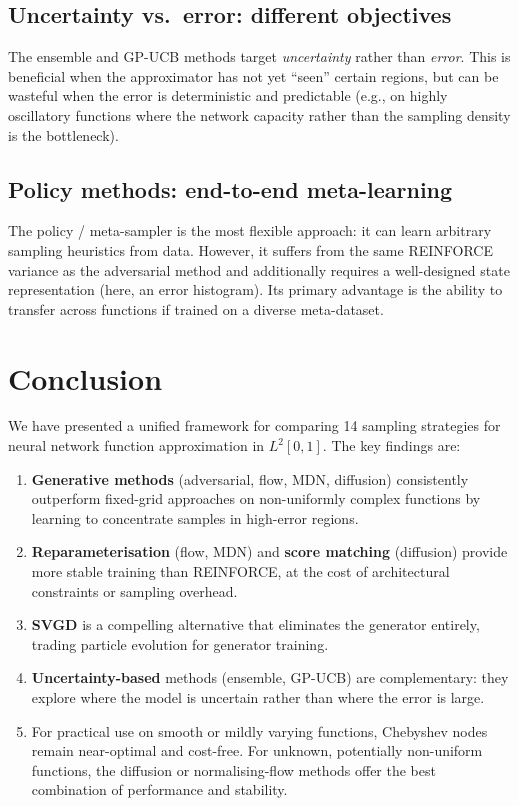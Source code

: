 \documentclass[11pt,a4paper]{article}
\begin{document}
\subsection{Uncertainty vs.\ error: different objectives}

The ensemble and GP-UCB methods target \emph{uncertainty} rather than
\emph{error}.  This is beneficial when the approximator has not yet
``seen'' certain regions, but can be wasteful when the error is
deterministic and predictable (e.g., on highly oscillatory functions
where the network capacity rather than the sampling density is the
bottleneck).

\subsection{Policy methods: end-to-end meta-learning}

The policy / meta-sampler is the most flexible approach: it can learn
arbitrary sampling heuristics from data.  However, it suffers from the
same REINFORCE variance as the adversarial method and additionally
requires a well-designed state representation (here, an error histogram).
Its primary advantage is the ability to transfer across functions if
trained on a diverse meta-dataset.

\section{Conclusion}

We have presented a unified framework for comparing 14 sampling
strategies for neural network function approximation in $L^2[0,1]$.
The key findings are:

\begin{enumerate}
  \item \textbf{Generative methods} (adversarial, flow, MDN, diffusion)
        consistently outperform fixed-grid approaches on non-uniformly
        complex functions by learning to concentrate samples in
        high-error regions.
  \item \textbf{Reparameterisation} (flow, MDN) and \textbf{score
        matching} (diffusion) provide more stable training than
        REINFORCE, at the cost of architectural constraints or
        sampling overhead.
  \item \textbf{SVGD} is a compelling alternative that eliminates the
        generator entirely, trading particle evolution for generator
        training.
  \item \textbf{Uncertainty-based} methods (ensemble, GP-UCB) are
        complementary: they explore where the model is uncertain rather
        than where the error is large.
  \item For practical use on smooth or mildly varying functions,
        Chebyshev nodes remain near-optimal and cost-free.  For unknown,
        potentially non-uniform functions, the diffusion or
        normalising-flow methods offer the best combination of
        performance and stability.
\end{enumerate}
\end{document}
